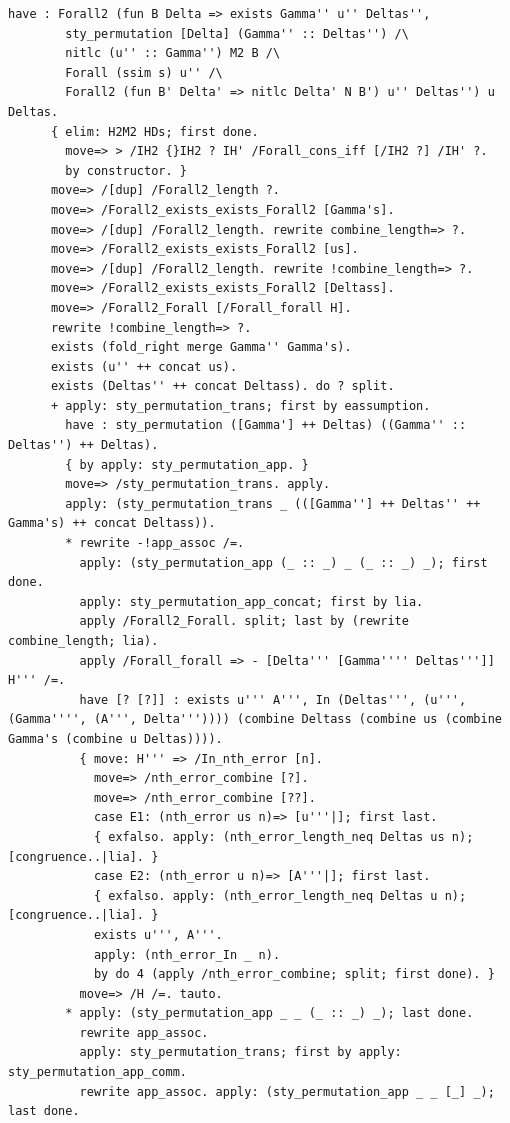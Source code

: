 \begin{lstlisting}[style=authorcoq]
      have : Forall2 (fun B Delta => exists Gamma'' u'' Deltas'',
        sty_permutation [Delta] (Gamma'' :: Deltas'') /\
        nitlc (u'' :: Gamma'') M2 B /\
        Forall (ssim s) u'' /\
        Forall2 (fun B' Delta' => nitlc Delta' N B') u'' Deltas'') u Deltas.
      { elim: H2M2 HDs; first done.
        move=> > /IH2 {}IH2 ? IH' /Forall_cons_iff [/IH2 ?] /IH' ?.
        by constructor. }
      move=> /[dup] /Forall2_length ?.
      move=> /Forall2_exists_exists_Forall2 [Gamma's].
      move=> /[dup] /Forall2_length. rewrite combine_length=> ?.
      move=> /Forall2_exists_exists_Forall2 [us].
      move=> /[dup] /Forall2_length. rewrite !combine_length=> ?.
      move=> /Forall2_exists_exists_Forall2 [Deltass].
      move=> /Forall2_Forall [/Forall_forall H].
      rewrite !combine_length=> ?.
      exists (fold_right merge Gamma'' Gamma's).
      exists (u'' ++ concat us).
      exists (Deltas'' ++ concat Deltass). do ? split.
      + apply: sty_permutation_trans; first by eassumption.
        have : sty_permutation ([Gamma'] ++ Deltas) ((Gamma'' :: Deltas'') ++ Deltas).
        { by apply: sty_permutation_app. }
        move=> /sty_permutation_trans. apply.
        apply: (sty_permutation_trans _ (([Gamma''] ++ Deltas'' ++ Gamma's) ++ concat Deltass)).
        * rewrite -!app_assoc /=.
          apply: (sty_permutation_app (_ :: _) _ (_ :: _) _); first done.
          apply: sty_permutation_app_concat; first by lia.
          apply /Forall2_Forall. split; last by (rewrite combine_length; lia).
          apply /Forall_forall => - [Delta''' [Gamma'''' Deltas''']] H''' /=.
          have [? [?]] : exists u''' A''', In (Deltas''', (u''', (Gamma'''', (A''', Delta''')))) (combine Deltass (combine us (combine Gamma's (combine u Deltas)))).
          { move: H''' => /In_nth_error [n].
            move=> /nth_error_combine [?].
            move=> /nth_error_combine [??].
            case E1: (nth_error us n)=> [u'''|]; first last.
            { exfalso. apply: (nth_error_length_neq Deltas us n); [congruence..|lia]. }
            case E2: (nth_error u n)=> [A'''|]; first last.
            { exfalso. apply: (nth_error_length_neq Deltas u n); [congruence..|lia]. }
            exists u''', A'''.
            apply: (nth_error_In _ n).
            by do 4 (apply /nth_error_combine; split; first done). }
          move=> /H /=. tauto.
        * apply: (sty_permutation_app _ _ (_ :: _) _); last done.
          rewrite app_assoc.
          apply: sty_permutation_trans; first by apply: sty_permutation_app_comm.
          rewrite app_assoc. apply: (sty_permutation_app _ _ [_] _); last done.

\end{lstlisting}
